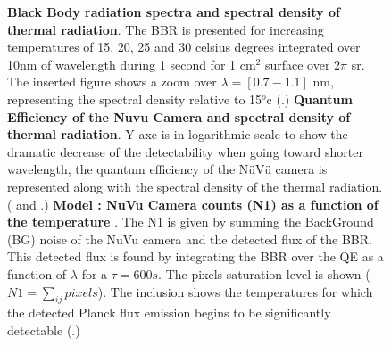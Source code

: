 \begin{figure}[htbp]
\begin{center}
\caption{{\bf Black Body radiation spectra and spectral density of thermal radiation}.  The BBR is presented for increasing temperatures of 15, 20, 25 and 30 celsius degrees integrated over 10nm of wavelength during 1 second for 1 cm$^2$ surface over $2\pi$ sr. The inserted figure shows a zoom over $\lambda = [0.7 - 1.1]$ nm, representing the spectral density relative to 15$^o$c (.)
{\bf Quantum Efficiency of the Nuvu Camera and spectral density of thermal radiation}.  Y axe is in logarithmic scale to show the dramatic decrease of the detectability when going toward shorter wavelength, the quantum efficiency of the NüVü camera is represented along with the spectral density of the thermal radiation.  ( and .)
{\bf Model : NuVu Camera counts (N1) as a function of the temperature  }.  The N1 is given by summing the BackGround (BG) noise of the NuVu camera and the detected flux of the BBR. This detected flux is found by integrating the BBR over the QE as a function of $\lambda$ for a $\tau = 600s$. The pixels saturation level is shown ($N1 = \sum_{ij} pixels$). The inclusion shows the temperatures for which the detected Planck flux emission begins to be significantly detectable  (.)}
\label{fig:BBRtheo1}
\end{center}
\end{figure}


